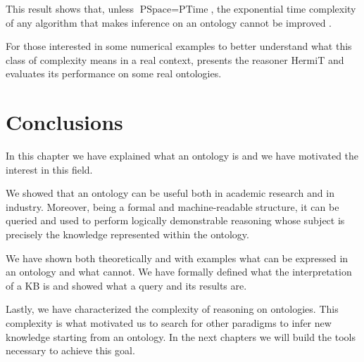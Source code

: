 This result shows that, unless $\text{PSpace} = \text{PTime}$, the exponential time complexity of any algorithm that makes inference on an ontology cannot be improved .

For those interested in some numerical examples to better understand what this class of complexity means in a real context, \cite{glimm2014hermit} presents the reasoner HermiT and evaluates its performance on some real ontologies.

\section{Conclusions}
In this chapter we have explained what an ontology is and we have motivated the interest in this field. 

We showed that an ontology can be useful both in academic research and in industry. Moreover, being a formal and machine-readable structure, it can be queried and used to perform logically demonstrable reasoning whose subject is precisely the knowledge represented within the ontology.

We have shown both theoretically and with examples what can be expressed in an ontology and what cannot. We have formally defined what the interpretation of a KB is and showed what a query and its results are.

Lastly, we have characterized the complexity of reasoning on ontologies. This complexity is what motivated us to search for other paradigms to infer new knowledge starting from an ontology. In the next chapters we will build the tools necessary to achieve this goal.

